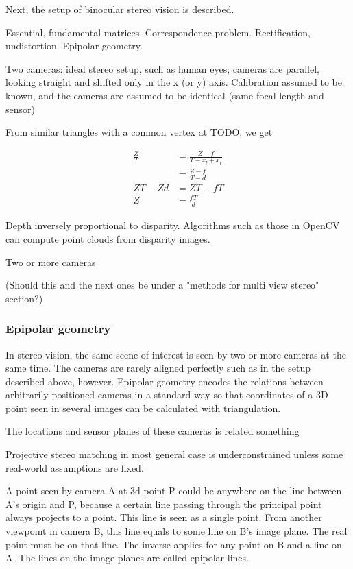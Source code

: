 Next, the setup of binocular stereo vision is described.

Essential, fundamental matrices. Correspondence problem. Rectification, undistortion. Epipolar geometry.

Two cameras: ideal stereo setup, such as human eyes; cameras are parallel, looking straight and shifted only in the x (or y) axis. Calibration assumed to be known, and the cameras are assumed to be identical (same focal length and sensor)

From similar triangles with a common vertex at TODO, we get

\begin{align}
	\frac{Z}{T} &= \frac{Z-f}{T - x_l + x_r} \\
	&= \frac{Z-f}{T - d}\\
	ZT - Zd &= ZT - fT\\
	Z &= \frac{fT}{d}
\end{align}


Depth inversely proportional to disparity. Algorithms such as those in OpenCV can compute point clouds from disparity images.

Two or more cameras

(Should this and the next ones be under a "methods for multi view stereo" section?)

\subsubsection{Epipolar geometry}

In stereo vision, the same scene of interest is seen by two or more cameras at the same time.
The cameras are rarely aligned perfectly such as in the setup described above, however.
Epipolar geometry encodes the relations between arbitrarily positioned cameras in a standard way so that coordinates of a 3D point seen in several images can be calculated with triangulation.

The locations and sensor planes of these cameras is related something

Projective stereo matching in most general case is underconstrained unless some real-world assumptions are fixed.



A point seen by camera A at 3d point P could be anywhere on the line between A's origin and P, because a certain line passing through the principal point always projects to a point.
This line is seen as a single point.
From another viewpoint in camera B, this line equals to some line on B's image plane.
The real point must be on that line.
The inverse applies for any point on B and a line on A.
The lines on the image planes are called epipolar lines.


